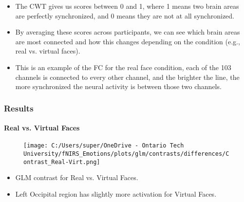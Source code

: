\documentclass{beamer}
\begin{document}
\begin{frame}
{\begin{itemize}
            \item The CWT gives us scores between 0 and 1, where 1 means two brain areas are perfectly synchronized, and 0 means they are not at all synchronized.
            \item By averaging these scores across participants, we can see which brain areas are most connected and how this changes depending on the condition (e.g., real vs. virtual faces).
            \item This is an example of the FC for the real face condition, each of the 103 channels is connected to every other channel, and the brighter the line, the more synchronized the neural activity is between those two channels.
        \end{itemize}
    }
\end{frame}

\begin{frame}
    \frametitle{Results}
    \framesubtitle{Real vs. Virtual Faces}
    \begin{figure}
        \centering
        \texttt{[image: C:/Users/super/OneDrive - Ontario Tech University/fNIRS\_Emotions/plots/glm/contrasts/differences/Contrast\_Real-Virt.png]}
    \end{figure}
    \begin{itemize}
        \small
        \item GLM contrast for Real vs. Virtual Faces.  
        \item Left Occipital region has slightly more activation for Virtual Faces. 
    \end{itemize}
\end{frame}
\end{document}
